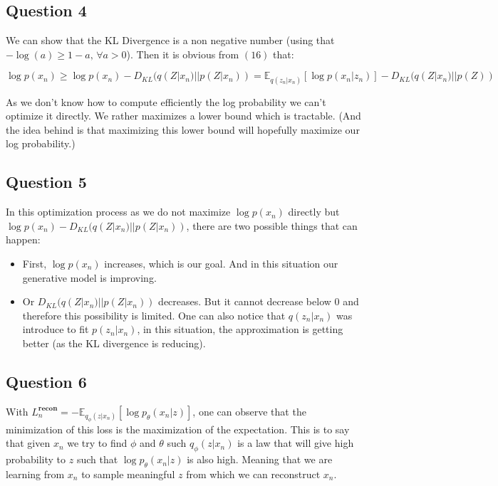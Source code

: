 \documentclass{article}
\begin{document}
\subsection*{Question 4}

We can show that the KL Divergence is a non negative number (using that $-\log(a) \ge 1 - a,\, \forall a > 0$).
Then it is obvious from $(16)$ that:

\begin{equation*}
    \log p(x_n) \ge \log p(x_n) - D_{KL}(q(Z | x_n) || p(Z | x_n)) = \mathbb{E}_{q(z_n|x_n)}\left[\log p(x_n | z_n)\right] - D_{KL}(q(Z | x_n) || p(Z))
\end{equation*}

As we don't know how to compute efficiently the log probability we can't optimize it directly. We rather maximizes a lower bound which
is tractable. (And the idea behind is that maximizing this lower bound will hopefully maximize our log probability.)


\subsection*{Question 5}

In this optimization process as we do not maximize $\log p(x_n)$ directly but $\log p(x_n) - D_{KL}(q(Z | x_n) || p(Z | x_n))$,
there are two possible things that can happen:
\begin{itemize}
    \item First, $\log p(x_n)$ increases, which is our goal. And in this situation our generative model is improving.
    \item Or $D_{KL}(q(Z | x_n) || p(Z | x_n))$ decreases. But it cannot decrease below 0 and therefore this possibility
          is limited. One can also notice that $q(z_n | x_n)$ was introduce to fit $p(z_n | x_n)$, in this situation, the approximation
          is getting better (as the KL divergence is reducing).
\end{itemize}

\subsection*{Question 6}
With $L_n^{\textbf{recon}} = - \mathbb{E}_{q_\phi(z|x_n)}\left[\log p_\theta(x_n | z) \right]$, one can observe that the minimization of this
loss is the maximization of the expectation. This is to say that given $x_n$ we try to find $\phi$ and $\theta$ such $q_\phi(z | x_n)$
is a law that will give high probability to $z$ such that $\log p_\theta(x_n | z)$ is also high. Meaning that we are learning
from $x_n$ to sample meaningful $z$ from which we can reconstruct $x_n$.
\end{document}
